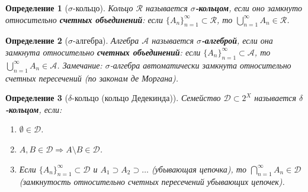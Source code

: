 \documentclass[a4paper, 12pt]{article}
\newtheorem{definition}{Определение}
\newcommand{\1}{\mathbf{1}}
\begin{document}
\begin{definition}[$\sigma$-кольцо]
    Кольцо $\mathcal{R}$ называется \textbf{$\sigma$-кольцом}, если оно замкнуто относительно \textbf{счетных объединений}: если $\{A_n\}_{n=1}^{\infty} \subset \mathcal{R}$, то $\bigcup_{n=1}^{\infty} A_n \in \mathcal{R}$.
\end{definition}

\begin{definition}[$\sigma$-алгебра]
    Алгебра $\mathcal{A}$ называется \textbf{$\sigma$-алгеброй}, если она замкнута относительно \textbf{счетных объединений}: если $\{A_n\}_{n=1}^{\infty} \subset \mathcal{A}$, то $\bigcup_{n=1}^{\infty} A_n \in \mathcal{A}$.
    \textit{Замечание:} $\sigma$-алгебра автоматически замкнута относительно счетных пересечений (по законам де Моргана).
\end{definition}

\begin{definition}[$\delta$-кольцо (кольцо Дедекинда)]
    Семейство $\mathcal{D} \subset 2^X$ называется \textbf{$\delta$-кольцом}, если:
    \begin{enumerate}[label=(\arabic*)]
        \item $\emptyset \in \mathcal{D}$.
        \item $A, B \in \mathcal{D} \Rightarrow A \setminus B \in \mathcal{D}$.
        \item Если $\{A_n\}_{n=1}^{\infty} \subset \mathcal{D}$ и $A_1 \supset A_2 \supset \dots$ (убывающая цепочка), то $\bigcap_{n=1}^{\infty} A_n \in \mathcal{D}$ (замкнутость относительно счетных пересечений убывающих цепочек).
    \end{enumerate}
\end{definition}
\end{document}
